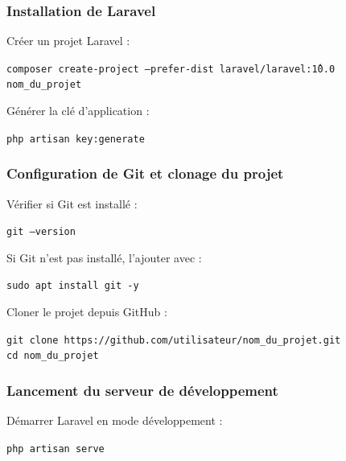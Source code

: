 \subsubsection*{Installation de Laravel}
Créer un projet Laravel :

\begin{tcolorbox}[colback=black, coltext=white, title=Création d’un projet Laravel, fonttitle=\bfseries]
\texttt{composer create-project --prefer-dist laravel/laravel:\^10.0 nom\_du\_projet}
\end{tcolorbox}

Générer la clé d’application :

\begin{tcolorbox}[colback=black, coltext=white, title=Génération de la clé d’application, fonttitle=\bfseries]
\texttt{php artisan key:generate}
\end{tcolorbox}

\subsubsection{Configuration de Git et clonage du projet}
Vérifier si Git est installé :

\begin{tcolorbox}[colback=black, coltext=white, title=Vérification de Git, fonttitle=\bfseries]
\texttt{git --version}
\end{tcolorbox}

Si Git n’est pas installé, l’ajouter avec :

\begin{tcolorbox}[colback=black, coltext=white, title=Installation de Git, fonttitle=\bfseries]
\texttt{sudo apt install git -y}
\end{tcolorbox}

Cloner le projet depuis GitHub :

\begin{tcolorbox}[colback=black, coltext=white, title=Clonage du projet, fonttitle=\bfseries]
\texttt{git clone https://github.com/utilisateur/nom\_du\_projet.git} \\
\texttt{cd nom\_du\_projet}
\end{tcolorbox}

\subsubsection{Lancement du serveur de développement}
Démarrer Laravel en mode développement :

\begin{tcolorbox}[colback=black, coltext=white, title=Lancement du serveur Laravel, fonttitle=\bfseries]
\texttt{php artisan serve}
\end{tcolorbox}

